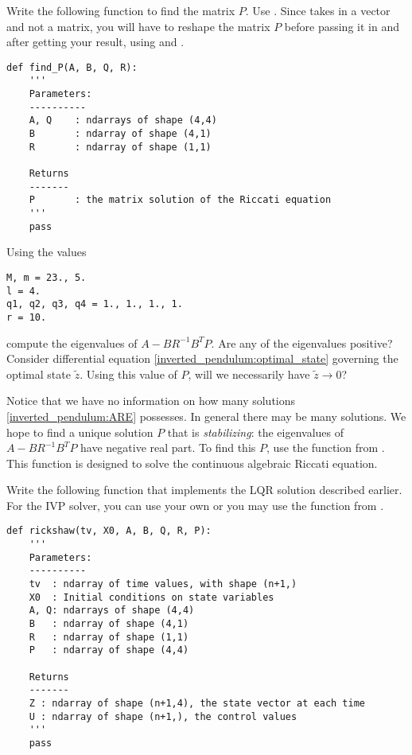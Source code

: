 \begin{problem}
Write the following function to find the matrix $P$. 
Use . 
Since  takes in a vector and not a matrix, you will have to reshape the matrix $P$ before passing it in and after getting your result, using  and .
\begin{lstlisting}
def find_P(A, B, Q, R):
	'''
	Parameters:
	----------
	A, Q 	: ndarrays of shape (4,4)
	B		: ndarray of shape (4,1)
	R		: ndarray of shape (1,1)
	
	Returns
	-------
	P		: the matrix solution of the Riccati equation
	'''
	pass

\end{lstlisting}
Using the values 
\begin{lstlisting}
M, m = 23., 5.
l = 4.
q1, q2, q3, q4 = 1., 1., 1., 1.
r = 10.
\end{lstlisting}
compute the eigenvalues of $A - BR^{-1}B^TP$.
Are any of the eigenvalues positive? 
Consider differential equation \eqref{inverted_pendulum:optimal_state} governing the optimal state $\tilde{z}$. 
Using this value of $P$, will we necessarily have $\tilde{z} \to 0$?
\end{problem}

Notice that we have no information on how many solutions \eqref{inverted_pendulum:ARE} possesses. 
In general there may be many solutions. 
We hope to find a unique solution $P$ that is \textit{stabilizing}: the eigenvalues of $A - BR^{-1}B^TP$ have negative real part. 
To find this $P$, use the function  from . 
This function is designed to solve the continuous algebraic Riccati equation. 

\begin{problem}
	Write the following function that implements the LQR solution described earlier.  For the IVP solver, you can use your own or you may use the function  from .
\begin{lstlisting}
def rickshaw(tv, X0, A, B, Q, R, P):
	'''
	Parameters:
	----------
	tv 	: ndarray of time values, with shape (n+1,)
	X0 	: Initial conditions on state variables
	A, Q: ndarrays of shape (4,4)
	B	: ndarray of shape (4,1)
	R	: ndarray of shape (1,1)
	P	: ndarray of shape (4,4)
	
	Returns
	-------
	Z : ndarray of shape (n+1,4), the state vector at each time
	U : ndarray of shape (n+1,), the control values
	'''
	pass
\end{lstlisting}
\label{prob:inverted_pendulum3}
\end{problem}

